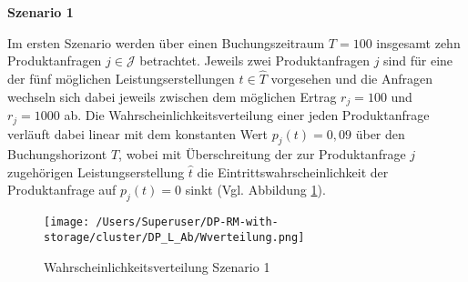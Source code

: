 \textbf{Szenario 1}

Im ersten Szenario werden über einen Buchungszeitraum $T=100$ insgesamt zehn Produktanfragen $j\in\mathcal{J}$ betrachtet. Jeweils zwei Produktanfragen $j$ sind für eine der fünf möglichen Leistungserstellungen $\hat t\in\hat T$ vorgesehen und die Anfragen wechseln sich dabei jeweils zwischen dem möglichen Ertrag $r_j=100$ und $r_j=1000$ ab. Die Wahrscheinlichkeitsverteilung einer jeden Produktanfrage verläuft dabei linear mit dem konstanten Wert $p_j(t)=0,09$ über den Buchungshorizont $T$, wobei mit Überschreitung der zur Produktanfrage $j$ zugehörigen Leistungserstellung $\hat t$ die Eintrittswahrscheinlichkeit der Produktanfrage auf $p_j(t)=0$ sinkt (Vgl. Abbildung \ref{SB1}).

\begin{figure}[h!]
  \begin{center}
    \texttt{[image: /Users/Superuser/DP-RM-with-storage/cluster/DP\_L\_Ab/Wverteilung.png]}
    \caption{Wahrscheinlichkeitsverteilung Szenario 1}  \label{SB1}
  \end{center}
\end{figure}

